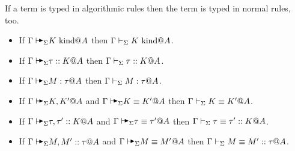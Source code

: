 \begin{theorem}
    \label{theorem:SoundnessOfAlgorithmicTyping}
    If a term is typed in algorithmic rules then the term is typed in normal rules, too.
    \begin{itemize}
        \item If \(\G\AVS K \iskind @ A \) then \(\Gamma\vdash_\Sigma K \text{\ kind} @A \).
        \item If \(\G\AVS \tau :: K @ A \) then \(\Gamma\vdash_\Sigma \tau ::K  @ A \).
        \item If \(\G\AVS M:\tau @ A \) then \(\Gamma\vdash_\Sigma M:\tau @ A \).
        \item If \(\G\AVS K,K' @ A\) and \(\G\AVS K\E K' @ A \) then \(\Gamma\vdash_\Sigma K\equiv K' @ A \).
        \item If \(\G\AVS \tau,\tau' :: K @ A \) and \(\G\AVS \tau \E \tau' @ A \) then \(\Gamma\vdash_\Sigma \tau \equiv \tau' :: K @ A \).
        \item If \(\G\AVS M,M' :: \tau @ A \) and \(\G\AVS M\E M' @ A \) then \(\Gamma\vdash_\Sigma M\equiv M' :: \tau @ A \).
    \end{itemize}
\end{theorem}

